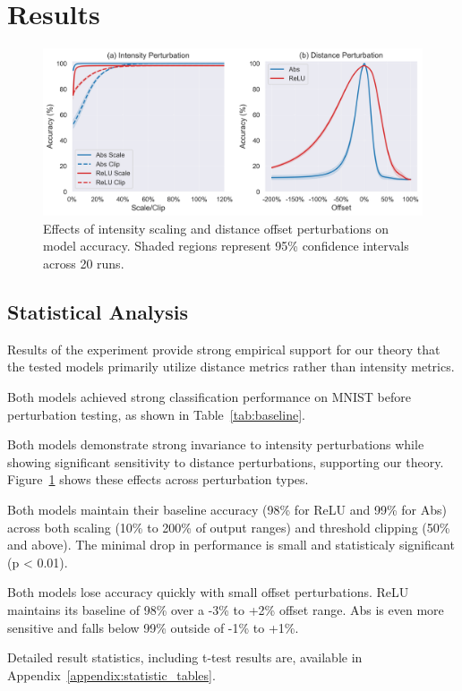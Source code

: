 \section{Results}

\begin{figure}[h]
    \centering
    \includegraphics[width=\textwidth]{images/perturbation_analysis}
    \caption{Effects of intensity scaling and distance offset perturbations on model accuracy. Shaded regions represent 95\% confidence intervals across 20 runs.}
    \label{fig:perturbation_analysis}
    \end{figure}
\subsection{Statistical Analysis}   

Results of the experiment provide strong empirical support for our theory that the tested models primarily utilize distance metrics rather than intensity metrics.

Both models achieved strong classification performance on MNIST before perturbation testing, as shown in Table~\ref{tab:baseline}.

Both models demonstrate strong invariance to intensity perturbations while showing significant sensitivity to distance perturbations, supporting our theory. Figure~\ref{fig:perturbation_analysis} shows these effects across perturbation types.

Both models maintain their baseline accuracy (98\% for ReLU and 99\% for Abs) across both scaling (10\% to 200\% of output ranges) and threshold clipping (50\% and above). The minimal drop in performance is small and statisticaly significant (p < 0.01). 

Both models lose accuracy quickly with small offset perturbations. ReLU maintains its baseline of 98\% over a -3\% to +2\% offset range. Abs is even more sensitive and falls below 99\% outside of -1\% to +1\%.

Detailed result statistics, including t-test results are, available in Appendix~\ref{appendix:statistic_tables}.

